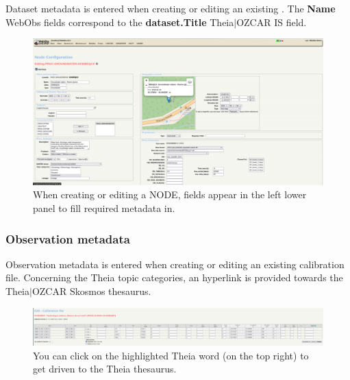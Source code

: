Dataset metadata is entered when creating or editing an existing . The \textbf{Name} WebObs  fields correspond to the \textbf{dataset.Title} Theia$\vert$OZCAR IS field.

\begin{figure}[!h]
	\centering
	\includegraphics[width=\textwidth, scale=0.4]{figures/formNODE.png}
	\caption{When creating or editing a NODE, fields appear in the left lower panel to fill required metadata in.}
\end{figure}


\subsubsection{Observation metadata}

Observation metadata is entered when creating or editing an existing calibration file. Concerning the Theia topic categories, an hyperlink is provided towards the Theia$\vert$OZCAR Skosmos thesaurus.

\begin{figure}[!h]
	\centering
	\includegraphics[width=\textwidth]{figures/calib_file_form.png}
	\caption{You can click on the highlighted Theia word (on the top right) to get driven to the Theia thesaurus.}
\end{figure}

